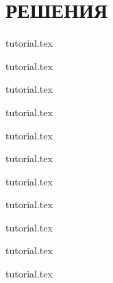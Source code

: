 \documentclass[a5paper, twoside, 11pt]{article}
\begin{document}
\newpage
{}
\section*{РЕШЕНИЯ}
\setcounter{subsection}{0}

\renewcommand{\importproblem}[1]{
\graphicspath{{problems/#1/statements/russian/}}
{tutorial.tex}	
}

\importproblem{prizes}
\importproblem{idiocracy}
\importproblem{robot-gardener}
\importproblem{simple-game}
\importproblem{rectangle-coloring}
\newpage
\importproblem{foodshop-2}
\importproblem{interview-at-fun-club}
\importproblem{relay-race-with-weight}
\importproblem{suburban-grasshoppers}
\importproblem{pills}
\importproblem{debt-evasion}

\begin{landscape}

\end{landscape}

\pagestyle{empty}
\tableofcontents
\end{document}
